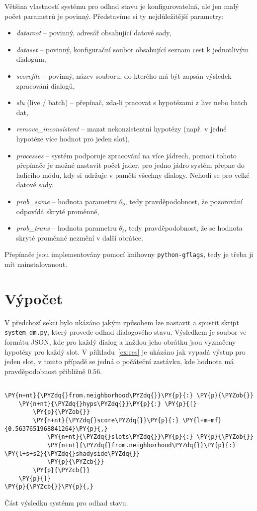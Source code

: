 Většina vlastností systému pro odhad stavu je konfigurovatelná, ale jen malý počet parametrů je povinný.
Představíme si ty nejdůležitější parametry:
\begin{itemize}
\item \emph{dataroot} -- povinný, adresář obsahující datové sady,
\item \emph{dataset} -- povinný, konfigurační soubor obsahující seznam cest k jednotlivým dialogům,
\item \emph{scorefile} -- povinný, název souboru, do kterého má být zapsán výsledek zpracování dialogů,
\item \emph{slu} (live / batch) -- přepínač, zda-li pracovat s hypotézami z live nebo batch dat,
\item \emph{remove\_inconsistent} -- mazat nekonzistentní hypotézy (např. v jedné hypotéze více hodnot pro jeden slot),
\item \emph{processes} -- systém podporuje zpracování na více jádrech, pomocí tohoto přepínače je možné nastavit počet jader, pro jedno jádro systém přepne do ladícího módu, kdy si udržuje v paměti všechny dialogy. Nehodí se pro velké datové sady.
\item \emph{prob\_same} -- hodnota parametru $\theta_o$, tedy pravděpodobnost, že pozorování odpovídá skryté proměnné,
\item \emph{prob\_trans} -- hodnota parametru $\theta_t$, tedy pravděpodobnost, že se hodnota skryté proměnné nezmění v další obrátce.
\end{itemize}

Přepínače jsou implementovány pomocí knihovny \texttt{python-gflags}, tedy je třeba ji mít nainstalovanout.

\section{Výpočet}

V předchozí sekci bylo ukázáno jakým způsobem lze nastavit a spustit skript \texttt{system\_dm.py}, který provede odhad dialogového stavu.
Výsledkem je soubor ve formátu JSON, kde pro každý dialog a každou jeho obrátku jsou vyznačeny hypotézy pro každý slot.
V příkladu~\ref{ex:res} je ukázáno jak vypadá výstup pro jeden slot, v tomto případě se jedná o počáteční zastávku, kde hodnota  má pravděpodobnost přibližně $0.56$.

\begin{example}
\begin{Verbatim}[commandchars=\\\{\}]

\PY{n+nt}{\PYZdq{}from.neighborhood\PYZdq{}}\PY{p}{:} \PY{p}{\PYZob{}}
    \PY{n+nt}{\PYZdq{}hyps\PYZdq{}}\PY{p}{:} \PY{p}{[}
        \PY{p}{\PYZob{}}
	    \PY{n+nt}{\PYZdq{}score\PYZdq{}}\PY{p}{:} \PY{l+m+mf}{0.5637651968841264}\PY{p}{,}
            \PY{n+nt}{\PYZdq{}slots\PYZdq{}}\PY{p}{:} \PY{p}{\PYZob{}}
	        \PY{n+nt}{\PYZdq{}from.neighborhood\PYZdq{}}\PY{p}{:} \PY{l+s+s2}{\PYZdq{}shadyside\PYZdq{}}
            \PY{p}{\PYZcb{}}
        \PY{p}{\PYZcb{}}
    \PY{p}{]}
\PY{p}{\PYZcb{}}\PY{p}{,}
\end{Verbatim}
\caption{Část výsledku systému pro odhad stavu.}
\label{ex:res}
\end{example}

